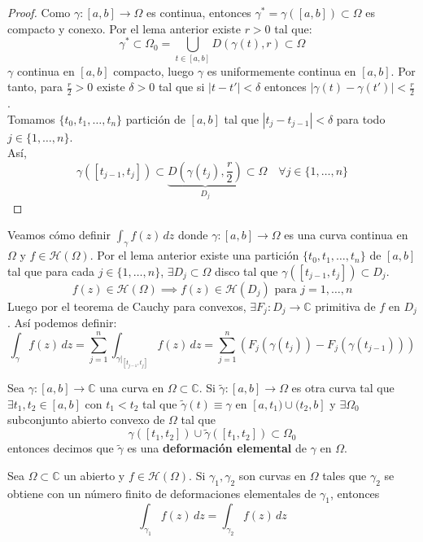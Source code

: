\begin{proof}
    Como $\gamma : [a, b] \to \Omega$ es continua, entonces $\gamma^* = \gamma([a, b]) \subset \Omega$ es compacto y conexo. Por el lema anterior existe $r > 0$ tal que:
    \[
        \gamma^* \subset \Omega_0 = \bigcup_{t \in [a,b]} D(\gamma(t), r) \subset \Omega
    \]
    $\gamma$ continua en $[a, b]$ compacto, luego $\gamma$ es uniformemente continua en $[a, b]$. Por tanto, para $\frac{r}{2} > 0$ existe $\delta > 0$ tal que si $|t - t'| < \delta$ entonces $|\gamma(t) - \gamma(t')| < \frac{r}{2}$.\\
    Tomamos $\{t_0, t_1, \ldots, t_n\}$ partición de $[a, b]$ tal que $|t_j - t_{j-1}| < \delta$ para todo $j \in \{1, \ldots, n\}$.\\
    Así, 
    \[
        \gamma ([t_{j-1}, t_j]) \subset \underbrace{D \left(\gamma(t_{j}), \frac{r}{2}\right) }_{D_j} \subset \Omega \quad \forall j \in \{1, \ldots, n\}
    \]
\end{proof}

Veamos cómo definir $\int_{\gamma} f(z) \, dz$ donde $\gamma : [a,b] \to \Omega$ es una curva continua en $\Omega$ y $f \in \mathcal{H}(\Omega)$. Por el lema anterior existe una partición $\{t_0, t_1, \ldots, t_n\}$ de $[a, b]$ tal que para cada $j \in \{1, \ldots, n\}$, $\exists D_j \subset \Omega$ disco tal que $\gamma([t_{j-1}, t_j]) \subset D_j$.
\[
    f(z) \in \mathcal{H}(\Omega) \implies f(z) \in \mathcal{H}(D_j) \text{ para } j = 1, \ldots, n
\]  
Luego por el teorema de Cauchy para convexos, $\exists F_j : D_j \to \mathbb{C}$ primitiva de $f$ en $D_j$. Así podemos definir:
\[
    \int_{\gamma} f(z) \, dz = \sum_{j=1}^{n} \int_{\gamma|_{[t_{j-1}, t_j]}} f(z) \, dz = \sum_{j=1}^{n} (F_j(\gamma(t_j)) - F_j(\gamma(t_{j-1})))
\]

\begin{definición} 
Sea $\gamma : [a, b] \to \mathbb{C}$ una curva en $\Omega \subset \mathbb{C}$. Si $\tilde{\gamma} : [a,b] \to \Omega$ es otra curva tal que $\exists t_1, t_2 \in [a,b]$ con $t_1 < t_2$ tal que $\tilde{\gamma}(t) \equiv \gamma$ en $[a, t_1) \cup (t_2, b]$ y $\exists \Omega_0$ subconjunto abierto convexo de $\Omega$ tal que 
\[
    \gamma([t_1, t_2]) \cup \tilde{\gamma}([t_1, t_2]) \subset \Omega_0
\]
entonces decimos que $\tilde{\gamma}$ es una \textbf{deformación elemental} de $\gamma$ en $\Omega$.
\end{definición}

\begin{proposición}
    Sea $\Omega \subset \mathbb{C}$ un abierto y $f \in \mathcal{H}(\Omega)$. Si $\gamma_1, \gamma_2$ son curvas en $\Omega$ tales que $\gamma_2$ se obtiene con un número finito de deformaciones elementales de $\gamma_1$, entonces
    \[
        \int_{\gamma_1} f(z) \, dz = \int_{\gamma_2} f(z) \, dz
    \]
\end{proposición}

